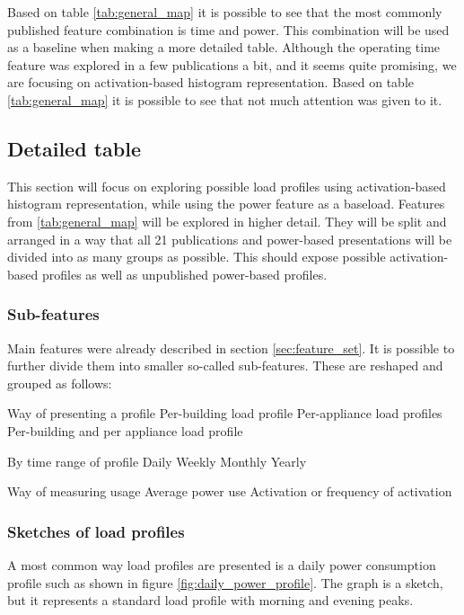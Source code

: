 Based on table \ref{tab:general_map} it is possible to see that the most commonly
published feature combination is time and power. This combination will be used 
as a baseline when making a more detailed table. Although the operating time feature was 
explored in a few publications a bit, and it seems quite promising, we are 
focusing on activation-based histogram representation.
Based on table \ref{tab:general_map} it is possible to see that not much attention was given to it. 

\subsection{Detailed table}

This section will focus on exploring possible load profiles using activation-based histogram representation,
while using the power feature as a baseload. 
Features from \ref{tab:general_map} will be explored in higher detail. 
They will be split and arranged in a way that all 21 publications and power-based presentations will be divided into as many groups as possible. 
This should expose possible activation-based profiles as well as unpublished power-based profiles.

\subsubsection{Sub-features} \label{sec:subfeatures}

Main features were already described in section \ref{sec:feature_set}.
It is possible to further divide them into smaller so-called sub-features.
These are reshaped and grouped as follows:
\begin{outline}

\1 Way of presenting a profile
\2 Per-building load profile
\2 Per-appliance load profiles
\2 Per-building and per appliance load profile

\1 By time range of profile 
\2 Daily
\2 Weekly
\2 Monthly
\2 Yearly

\1 Way of measuring usage
\2 Average power use 
\2 Activation or frequency of activation
\end{outline}

\subsubsection{Sketches of load profiles}
A most common way load profiles are presented is a daily power consumption profile such as shown in figure \ref{fig:daily_power_profile}. 
The graph is a sketch, but it represents a standard load profile with morning and evening peaks.


